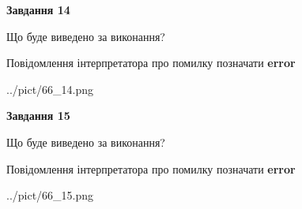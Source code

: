 \documentclass[11pt, ukrainian]{article}
\begin{document}
{\begin {large}
{\begin {center}\textbf{Завдання 14}\end {center}}\par
Що буде виведено за виконання? \par
Повідомлення інтерпретатора про помилку позначати \textbf{error}

\begin{center}
	{../pict/66_14.png}
\end{center}
\newpage

{\begin {center}\textbf{Завдання 15}\end {center}}\par
Що буде виведено за виконання? \par
Повідомлення інтерпретатора про помилку позначати \textbf{error}

\begin{center}
	{../pict/66_15.png}
\end{center}
\newpage

\end {large}}
\end{document}
